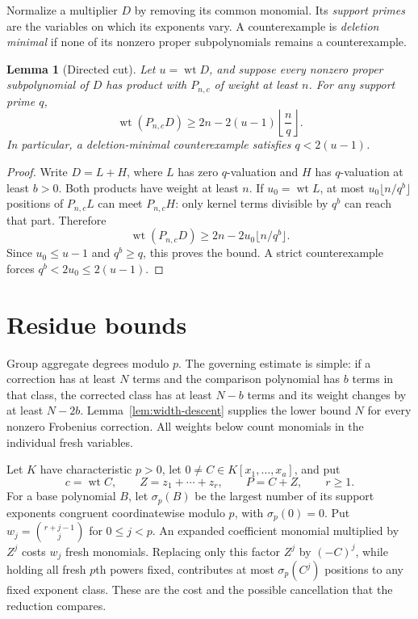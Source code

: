\documentclass[11pt]{article}
\DeclareMathOperator{\wt}{wt}\DeclareMathOperator{\ord}{ord}
\numberwithin{equation}{section}
\newtheorem{lemma}[theorem]{Lemma}
\theoremstyle{definition}\newtheorem{definition}[theorem]{Definition}
\theoremstyle{remark}\newtheorem{remark}[theorem]{Remark}
\begin{document}
Normalize a multiplier $D$ by removing its common monomial. Its
\emph{support primes} are the variables on which its exponents vary.
A counterexample is \emph{deletion minimal} if none of its nonzero
proper subpolynomials remains a counterexample.

\begin{lemma}[Directed cut]\label{lem:directed-cut}
Let $u=\wt D$, and suppose every nonzero proper subpolynomial of $D$
has product with $P_{n,c}$ of weight at least $n$. For any support
prime $q$,
\[
 \wt(P_{n,c}D)\ge2n-2(u-1)\left\lfloor\frac nq\right\rfloor.
\]
In particular, a deletion-minimal counterexample satisfies
$q<2(u-1)$.
\end{lemma}
\begin{proof}
Write $D=L+H$, where $L$ has zero $q$-valuation and $H$ has
$q$-valuation at least $b>0$. Both products have weight at least
$n$. If $u_0=\wt L$, at most $u_0\lfloor n/q^b\rfloor$ positions
of $P_{n,c}L$ can meet $P_{n,c}H$: only kernel terms divisible by
$q^b$ can reach that part. Therefore
\[
 \wt(P_{n,c}D)\ge2n-2u_0\lfloor n/q^b\rfloor.
\]
Since $u_0\le u-1$ and $q^b\ge q$, this proves the bound. A strict
counterexample forces $q^b<2u_0\le2(u-1)$.
\end{proof}


\section{Residue bounds}
\label{sec:residue}

Group aggregate degrees modulo $p$. The governing estimate is simple:
if a correction has at least $N$ terms and the comparison polynomial
has $b$ terms in that class, the corrected class has at least $N-b$
terms and its weight changes by at least $N-2b$.
Lemma~\ref{lem:width-descent} supplies the lower bound $N$ for every
nonzero Frobenius correction. All weights below count monomials
in the individual fresh variables.

Let $K$ have characteristic $p>0$, let $0\ne C\in K[x_1,\ldots,x_a]$,
and put
\[
 c=\wt C,\qquad Z=z_1+\cdots+z_r,\qquad P=C+Z,\qquad r\ge1.
\]
For a base polynomial $B$, let $\sigma_p(B)$ be the largest number
of its support exponents congruent coordinatewise modulo $p$, with
$\sigma_p(0)=0$. Put $w_j=\binom{r+j-1}{j}$ for $0\le j<p$.
An expanded coefficient monomial multiplied by $Z^j$ costs $w_j$
fresh monomials. Replacing only this factor $Z^j$ by $(-C)^j$,
while holding all fresh $p$th powers fixed, contributes at most
$\sigma_p(C^j)$ positions to any fixed exponent class. These are
the cost and the possible cancellation that the reduction compares.
\end{document}
